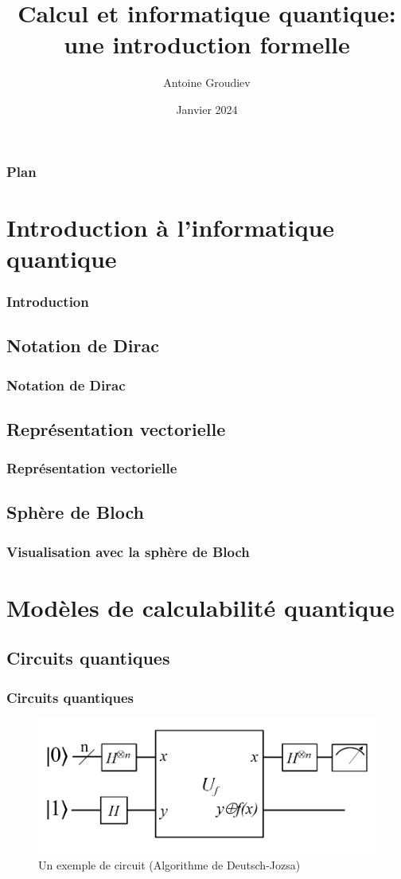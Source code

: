 \documentclass[aspectratio=169]{beamer}
\title{\textbf{Calcul et informatique quantique:\\une introduction formelle}}
\author{Antoine Groudiev}
\institute{ENS Ulm}
\date{Janvier 2024}
\theoremstyle{plain}
\theoremstyle{definition}
\begin{document}
\frame{\titlepage}

\begin{frame}
    \frametitle{Plan}
    \tableofcontents
\end{frame}

\section{Introduction à l'informatique quantique}
\begin{frame}
    \frametitle{Introduction}
\end{frame}

\subsection{Notation de Dirac}
\begin{frame}
    \frametitle{Notation de Dirac}
\end{frame}

\subsection{Représentation vectorielle}
\begin{frame}
    \frametitle{Représentation vectorielle}
\end{frame}

\subsection{Sphère de Bloch}
\begin{frame}
    \frametitle{Visualisation avec la sphère de Bloch}
\end{frame}

\section{Modèles de calculabilité quantique}
\subsection{Circuits quantiques}
\begin{frame}
    \frametitle{Circuits quantiques}
    \begin{figure}[!ht]
        \centering
        \includegraphics[scale=0.4]{deutsch-circuit-n.png}
        \caption{Un exemple de circuit (Algorithme de Deutsch-Jozsa)}
    \end{figure}
\end{frame}
\end{document}
